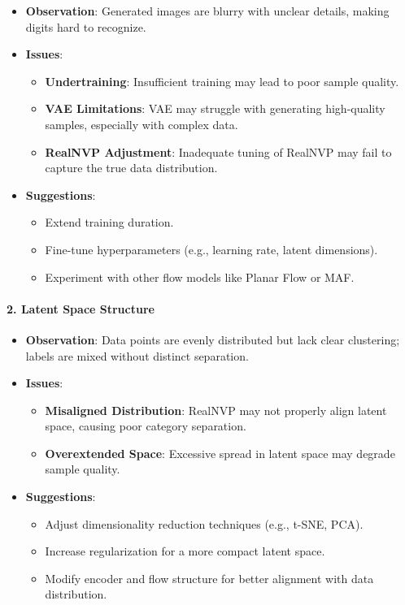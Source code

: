 \documentclass[11pt]{article}
\providecommand{\tightlist}{%
      \setlength{\itemsep}{0pt}\setlength{\parskip}{0pt}}
\begin{document}
\begin{itemize}
\tightlist
\item
  \textbf{Observation}: Generated images are blurry with unclear
  details, making digits hard to recognize.
\item
  \textbf{Issues}:

  \begin{itemize}
  \tightlist
  \item
    \textbf{Undertraining}: Insufficient training may lead to poor
    sample quality.
  \item
    \textbf{VAE Limitations}: VAE may struggle with generating
    high-quality samples, especially with complex data.
  \item
    \textbf{RealNVP Adjustment}: Inadequate tuning of RealNVP may fail
    to capture the true data distribution.
  \end{itemize}
\item
  \textbf{Suggestions}:

  \begin{itemize}
  \tightlist
  \item
    Extend training duration.
  \item
    Fine-tune hyperparameters (e.g., learning rate, latent dimensions).
  \item
    Experiment with other flow models like Planar Flow or MAF.
  \end{itemize}
\end{itemize}

\paragraph{\texorpdfstring{2. \textbf{Latent Space
Structure}}{2. Latent Space Structure}}\label{latent-space-structure}

\begin{itemize}
\tightlist
\item
  \textbf{Observation}: Data points are evenly distributed but lack
  clear clustering; labels are mixed without distinct separation.
\item
  \textbf{Issues}:

  \begin{itemize}
  \tightlist
  \item
    \textbf{Misaligned Distribution}: RealNVP may not properly align
    latent space, causing poor category separation.
  \item
    \textbf{Overextended Space}: Excessive spread in latent space may
    degrade sample quality.
  \end{itemize}
\item
  \textbf{Suggestions}:

  \begin{itemize}
  \tightlist
  \item
    Adjust dimensionality reduction techniques (e.g., t-SNE, PCA).
  \item
    Increase regularization for a more compact latent space.
  \item
    Modify encoder and flow structure for better alignment with data
    distribution.
  \end{itemize}
\end{itemize}
\end{document}
